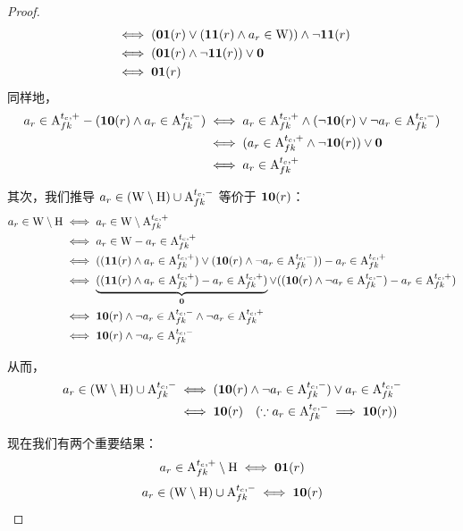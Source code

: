 \begin{proof}
\begin{equation*}
\begin{aligned}
    &\iff (\textbf{0$$1}({r}) \vee (\textbf{1$$1}({r}) \wedge a_r\in\mathrm{W})) \wedge \neg\textbf{1$$1}({r}) \\
    &\iff (\textbf{0$$1}({r}) \wedge \neg\textbf{1$$1}({r})) \vee \mathbf{0} \\
    &\iff \textbf{0$$1}({r})
\end{aligned}
\end{equation*}
同样地，
\begin{equation*}
\begin{aligned}
    a_r\in{\mathrm{A}_{fk}^{t_c,+}} - (\textbf{1$$0}({r}) \wedge a_r\in{\mathrm{A}_{fk}^{t_c,-}})
    &\iff a_r\in{\mathrm{A}_{fk}^{t_c,+}} \wedge (\neg\textbf{1$$0}({r}) \vee \neg a_r\in{\mathrm{A}_{fk}^{t_c,-}}) \\
    &\iff (a_r\in{\mathrm{A}_{fk}^{t_c,+}} \wedge \neg\textbf{1$$0}({r})) \vee \mathbf{0} \\
    &\iff a_r\in{\mathrm{A}_{fk}^{t_c,+}}
\end{aligned}
\end{equation*}

其次，我们推导 $a_r\in(\mathrm{W}\setminus\mathrm{H})\cup{\mathrm{A}_{fk}^{t_c,-}}$ 等价于 $\textbf{1$$0}({r})$：
\begin{equation*}
\begin{aligned}
    a_r\in\mathrm{W}\setminus\mathrm{H}
    & \iff a_r\in\mathrm{W}\setminus{\mathrm{A}_{fk}^{t_c,+}} \\
    & \iff a_r\in\mathrm{W} - a_r\in{\mathrm{A}_{fk}^{t_c,+}} \\
    & \iff ((\textbf{1$$1}({r}) \wedge a_r\in{\mathrm{A}_{fk}^{t_c,+}}) \vee (\textbf{1$$0}({r}) \wedge \neg a_r\in{\mathrm{A}_{fk}^{t_c,-}})) - a_r\in{\mathrm{A}_{fk}^{t_c,+}} \\
    & \iff \underbrace{((\textbf{1$$1}({r}) \wedge a_r\in{\mathrm{A}_{fk}^{t_c,+}}) - a_r\in{\mathrm{A}_{fk}^{t_c,+}})}_{\mathbf{0}} \vee ((\textbf{1$$0}({r}) \wedge \neg a_r\in{\mathrm{A}_{fk}^{t_c,-}}) - a_r\in{\mathrm{A}_{fk}^{t_c,+}}) \\
    & \iff \textbf{1$$0}({r}) \wedge \neg a_r\in{\mathrm{A}_{fk}^{t_c,-}} \wedge \neg a_r\in{\mathrm{A}_{fk}^{t_c,+}} \\
    & \iff \textbf{1$$0}({r}) \wedge \neg a_r\in{\mathrm{A}_{fk}^{t_c,-}}
\end{aligned}
\end{equation*}

从而，
\begin{equation*}
\begin{aligned}
    a_r\in(\mathrm{W}\setminus\mathrm{H})\cup{\mathrm{A}_{fk}^{t_c,-}}
    & \iff (\textbf{1$$0}({r}) \wedge \neg a_r\in{\mathrm{A}_{fk}^{t_c,-}}) \vee a_r\in{\mathrm{A}_{fk}^{t_c,-}} \\
    & \iff \textbf{1$$0}({r}) \quad (\because a_r\in{\mathrm{A}_{fk}^{t_c,-}} \implies \textbf{1$$0}({r}))
\end{aligned}
\end{equation*}

现在我们有两个重要结果：
\[
    a_r\in{\mathrm{A}_{fk}^{t_c,+}}\setminus\mathrm{H} \iff \textbf{0$$1}({r})
\]
\[
    a_r\in(\mathrm{W}\setminus\mathrm{H})\cup{\mathrm{A}_{fk}^{t_c,-}} \iff \textbf{1$$0}({r})
\]


\end{proof}
